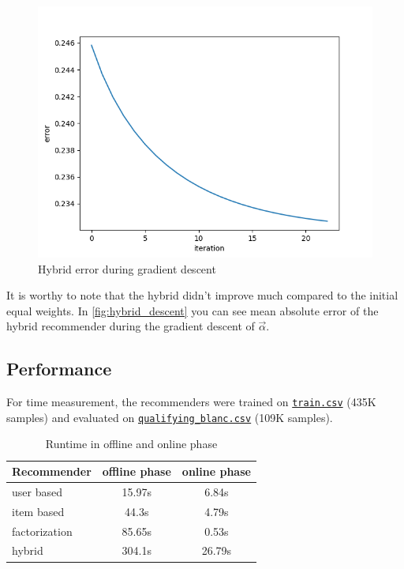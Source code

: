 \documentclass[11pt]{scrartcl}
\begin{document}
\begin{figure}[!htb]
	\centering
	\includegraphics[scale=0.4]{../plots/descent.png}
	\caption{Hybrid error during gradient descent}\label{fig:hybrid_descent}
\end{figure}
It is worthy to note that the hybrid didn't improve much compared to the initial equal weights.
In \autoref{fig:hybrid_descent} you can see mean absolute error of the hybrid recommender during the gradient descent of $\vec{\alpha}$.

\subsection{Performance}
For time measurement, the recommenders were trained on \href{run:../input/train.csv}{\texttt{train.csv}} (435K samples) and evaluated on \href{run:../input/qualifying_blanc.csv}{\texttt{qualifying\_blanc.csv}} (109K samples).
\begin{table}[!htb]
	\centering
	\begin{tabular}{|l|c|c|}
		\hline
		Recommender   & offline phase & online phase \\\hline\hline
		user based    & 15.97s        & 6.84s        \\\hline
		item based    & 44.3s         & 4.79s        \\\hline
		factorization & 85.65s        & 0.53s        \\\hline
		hybrid        & 304.1s        & 26.79s       \\\hline
	\end{tabular}
	\caption{Runtime in offline and online phase}\label{tab:performance}
\end{table}
\end{document}

